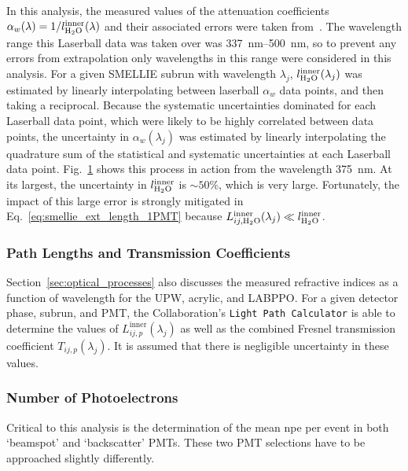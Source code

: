 In this analysis, the measured values of the attenuation coefficients $\alpha_{w}(\lambda) = 1/l_{\ce{H_{2}O}}^{\mathrm{inner}}(\lambda)$ and their associated errors were taken from~\cite{andersonOpticalCalibrationSNO2021}. The wavelength range this Laserball data was taken over was \SIrange{337}{500}{\nm}, so to prevent any errors from extrapolation only wavelengths in this range were considered in this analysis. For a given SMELLIE subrun with wavelength $\lambda_{j}$, $l_{\ce{H_{2}O}}^{\mathrm{inner}}(\lambda_{j})$ was estimated by linearly interpolating between laserball $\alpha_{w}$ data points, and then taking a reciprocal. Because the systematic uncertainties dominated for each Laserball data point, which were likely to be highly correlated between data points, the uncertainty in $\alpha_{w}(\lambda_{j})$ was estimated by linearly interpolating the quadrature sum of the statistical and systematic uncertainties at each Laserball data point. Fig.~\ref{fig:smellie_laserball_water_ext_length_est} shows this process in action from the wavelength \SI{375}{\nm}. At its largest, the uncertainty in $l_{\ce{H_{2}O}}^{\mathrm{inner}}$ is $\sim50\%$, which is very large. Fortunately, the impact of this large error is strongly mitigated in Eq.~\ref{eq:smellie_ext_length_1PMT} because $L_{ij,\ce{H_{2}O}}^{\mathrm{inner}}(\lambda_{j})\ll l_{\ce{H_{2}O}}^{\mathrm{inner}}$.

\begin{figure}
    \centering
    \caption[]{}
    \label{fig:smellie_laserball_water_ext_length_est}
\end{figure}

\subsubsection{Path Lengths and Transmission Coefficients}
Section~\ref{sec:optical_processes} also discusses the measured refractive indices as a function of wavelength for the UPW, acrylic, and LABPPO. For a given detector phase, subrun, and PMT, the Collaboration's \texttt{Light Path Calculator} is able to determine the values of $L_{ij,p}^{\mathrm{inner}}(\lambda_{j})$ as well as the combined Fresnel transmission coefficient $T_{ij,p}(\lambda_{j})$. It is assumed that there is negligible uncertainty in these values.

\subsubsection{Number of Photoelectrons}
Critical to this analysis is the determination of the mean npe per event in both `beamspot' and `backscatter' PMTs. These two PMT selections have to be approached slightly differently.


